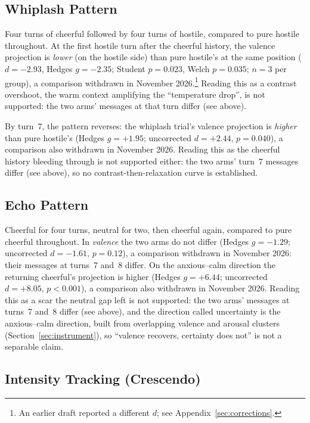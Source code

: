 \documentclass[11pt,a4paper]{article}
\begin{document}
\subsection{Whiplash Pattern}

Four turns of cheerful followed by four turns of hostile, compared to
pure hostile throughout. At the first hostile turn after the cheerful
history, the valence projection is \emph{lower} (on the hostile side)
than pure hostile's at the same position ($d{=}-2.93$, Hedges
$g{=}-2.35$; Student $p{=}0.023$, Welch $p{=}0.035$; $n{=}3$ per
group), a comparison withdrawn in November 2026.\footnote{An earlier draft reported a different $d$; see
Appendix~\ref{sec:corrections}.} Reading this as a contrast overshoot,
the warm context amplifying the ``temperature drop'', is not supported:
the two arms' messages at that turn differ (see above).

By turn~7, the pattern reverses: the whiplash trial's valence projection
is \emph{higher} than pure hostile's (Hedges $g{=}+1.95$; uncorrected
$d{=}+2.44$, $p{=}0.040$), a comparison also withdrawn in November 2026.
Reading this as the cheerful history bleeding
through is not supported either: the two arms' turn~7 messages differ
(see above), so no contrast-then-relaxation curve is established.

\subsection{Echo Pattern}

Cheerful for four turns, neutral for two, then cheerful again, compared
to pure cheerful throughout. In \emph{valence} the two arms do not differ
(Hedges $g{=}-1.29$; uncorrected $d{=}-1.61$, $p{=}0.12$), a comparison
withdrawn in November 2026: their messages at turns~7 and~8 differ. On
the anxious--calm direction the returning cheerful's projection is higher
(Hedges $g{=}+6.44$; uncorrected $d{=}+8.05$, $p{<}0.001$), a comparison
also withdrawn in November 2026. Reading this
as a scar the neutral gap left is not supported: the two arms' messages
at turns~7 and~8 differ (see above), and the direction called
uncertainty is the anxious--calm direction, built from overlapping
valence and arousal clusters (Section~\ref{sec:instrument}), so
``valence recovers, certainty does not'' is not a separable claim.

\subsection{Intensity Tracking (Crescendo)}
\end{document}

